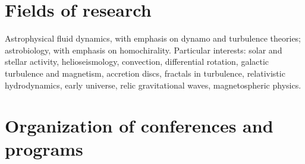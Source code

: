 \documentclass{article}
\begin{document}
\section*{Fields of research}

Astrophysical fluid dynamics, 
with emphasis on dynamo and turbulence theories;
astrobiology, with emphasis on homochirality.
Particular interests: solar and stellar activity, helioseismology,
convection, differential rotation, galactic turbulence and magnetism,
accretion discs, fractals in turbulence, relativistic hydrodynamics,
early universe, relic gravitational waves, magnetospheric physics.
\\

\section*{Organization of conferences and programs}
\end{document}
